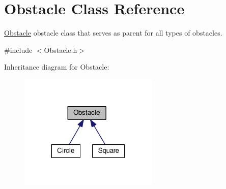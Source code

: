 \hypertarget{classObstacle}{}\section{Obstacle Class Reference}
\label{classObstacle}


\hyperlink{classObstacle}{Obstacle} obstacle class that serves as parent for all types of obstacles.  




{\ttfamily \#include $<$Obstacle.\+h$>$}



Inheritance diagram for Obstacle\+:
\nopagebreak
\begin{figure}[H]
\begin{center}
\leavevmode
\includegraphics[width=188pt]{classObstacle__inherit__graph}
\end{center}
\end{figure}
